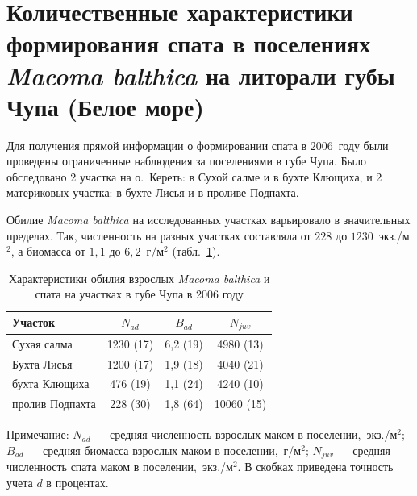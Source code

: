 	\section{Количественные характеристики формирования спата в поселениях {\it Macoma balthica}  на литорали губы Чупа (Белое море)}
Для получения прямой информации о формировании спата в $2006$~году были проведены ограниченные наблюдения за поселениями в губе Чупа.
Было обследовано 2 участка на о.~Кереть: в Сухой салме и в бухте Клющиха, и 2 материковых участка: в бухте Лисья и в проливе Подпахта.

Обилие {\it Macoma balthica} на исследованных участках варьировало в значительных пределах. 
Так, численность на разных участках составляла от $228$ до $1230$~экз./м$^2$, а биомасса от $1,1$ до $6,2$~г/м$^2$ (табл.~\ref{tab:NMacoma_recruitment}). 
\begin{table}[p]
\caption{Характеристики обилия взрослых {\it Macoma balthica} и спата на участках в губе Чупа в 2006 году}
\label{tab:NMacoma_recruitment}
\begin{center}
\begin{tabular}{|l|cc|c|}
\hline
Участок         & $N_{ad}$  & $B_{ad}$   & $N_{juv}$ \\ \hline
Сухая салма     & 1230 (17) & 6,2 (19) & 4980 (13)  \\  
Бухта Лисья     & 1200 (17) & 1,9 (18) & 4040 (21)  \\ 
бухта Клющиха   & 476 (19)  & 1,1 (24) & 4240 (10)  \\  
пролив Подпахта & 228 (30)  & 1,8 (64) & 10060 (15) \\ \hline
\end{tabular}
\end{center}

\footnotesize{Примечание: $N_{ad}$ --- средняя численность взрослых маком в поселении,~экз./м$^2$; 
$B_{ad}$ --- средняя биомасса взрослых маком в поселении,~г/м$^2$; 
$N_{juv}$ --- средняя численность спата маком в поселении,~экз./м$^2$. 
В скобках приведена точность учета $d$ в процентах.}
\end{table}

